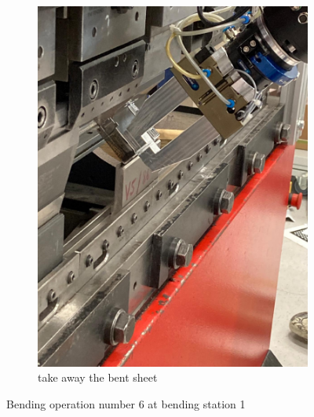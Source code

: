 \begin{figure}[h]
\begin{subfigure}[b]{0.32\textwidth}
        \includegraphics[width=\textwidth]{figures/bending/bending6-002.png}
        \caption{take away the bent sheet}
        \label{subfig:bending6-after}
    \end{subfigure}\hspace{0.1cm}
    \caption{Bending operation number 6 at bending station 1}
    \label{fig:bending-operation-6}
\end{figure}